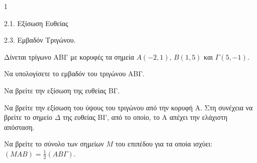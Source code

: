 \begin{ylh}{1}
    \item 2.1. Εξίσωση Ευθείας
    \item 2.3. Εμβαδόν Τριγώνου.
\end{ylh}
Δίνεται τρίγωνο ΑΒΓ με κορυφές τα σημεία $A(-2, 1)$, $B(1, 5)$ και $\Gamma(5, -1)$.
\begin{alist}
\item Να υπολογίσετε το εμβαδόν του τριγώνου ΑΒΓ. 
\item Να βρείτε την εξίσωση της ευθείας ΒΓ. 
\item Να βρείτε την εξίσωση του ύψους του τριγώνου από την κορυφή Α. Στη συνέχεια να βρείτε το σημείο $\Delta$ της ευθείας ΒΓ, από το οποίο, το Α απέχει την ελάχιστη απόσταση. 
\item Να βρείτε το σύνολο των σημείων $M$ του επιπέδου για τα οποία ισχύει: $(MAB) = \frac{1}{2} (AB\Gamma)$. 
\end{alist}